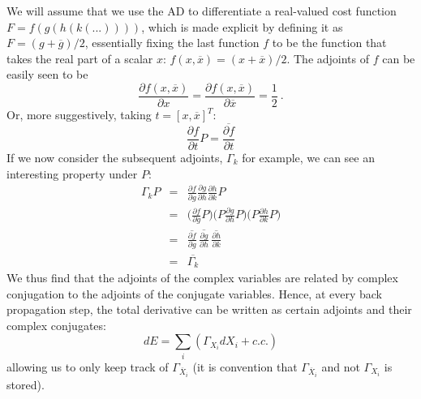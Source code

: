 \documentclass[twocolumn,floatfix,superscriptaddress,longbibliography,pra]{revtex4-2}
\begin{document}
We will assume that we use the AD to differentiate a real-valued cost function $F=f(g(h(k(...))))$, which is made explicit by defining it as $F=(g+\overline{g})/2$, essentially fixing the last function $f$ to be the function that takes the real part of a scalar $x$: $f(x,\overline{x})=(x+\overline{x})/2$.
The adjoints of $f$ can be easily seen to be 
\begin{equation}
    \frac{\partial f(x,\overline{x})}{\partial x}=\frac{\partial f(x,\overline{x})}{\partial \overline{x}}=\frac{1}{2}\ .
\end{equation}
Or, more suggestively, taking $t=[x,\overline{x}]^T$:
\begin{equation}
    \frac{\partial f}{\partial t}P=\overline{\frac{\partial f}{\partial t}}
\end{equation}
If we now consider the subsequent adjoints, $\Gamma_k$ for example, we can see an interesting property under $P$:
\begin{eqnarray}
    \Gamma_kP&=&\frac{\partial f}{\partial g}\frac{\partial g}{\partial h}\frac{\partial h}{\partial k}P\\
    &=&\big(\frac{\partial f}{\partial g}P\big)\big(P\frac{\partial g}{\partial h}P\big)\big(P\frac{\partial h}{\partial k}P\big)\\
    &=&\overline{\frac{\partial f}{\partial g}}\,\overline{\frac{\partial g}{\partial h}}\,\overline{\frac{\partial h}{\partial k}}\\
    &=&\overline{\Gamma_k}
\end{eqnarray}
We thus find that the adjoints of the complex variables are related by complex conjugation to the adjoints of the conjugate variables. Hence, at every back propagation step, the total derivative can be written as certain adjoints and their complex conjugates:
\begin{equation}
    dE = \sum_i \left(\Gamma_{X_i} dX_i + c.c.\right)
\end{equation}
allowing us to only keep track of $\Gamma_{\overline{X}_i}$ (it is convention that $\Gamma_{\overline{X}_i}$ and not $\Gamma_{X_i}$ is stored).
\end{document}
